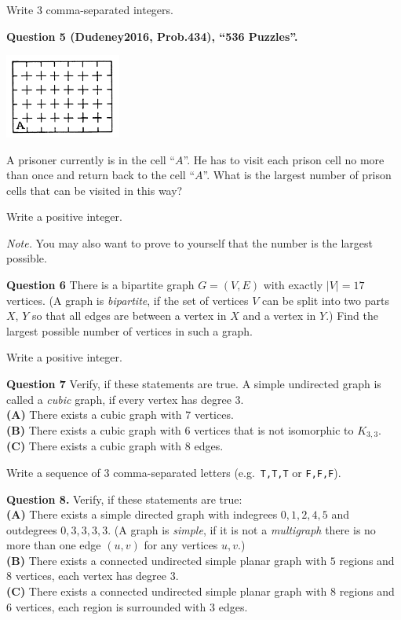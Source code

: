 \documentclass[jou]{apa6}
\begin{document}
Write $3$ comma-separated integers.



\vspace{10pt}
{\bf Question 5 (Dudeney2016, Prob.434), ``536 Puzzles''.}
\begin{center}
\includegraphics[width=1.5in]{prison-cells.png}
\end{center}
A prisoner currently is in the cell ``$A$''. He has to visit each 
prison cell no more than once and return 
back to the cell ``$A$''. What is the largest number of prison cells that
can be visited in this way?

Write a positive integer.

{\em Note.} You may also want to prove to yourself that the number is the largest possible.


\vspace{10pt}
{\bf Question 6}
There is a bipartite graph $G=(V,E)$ with exactly $|V| = 17$ vertices. (A graph is {\em bipartite}, if 
the set of vertices $V$ can be split into two parts $X$, $Y$ so that all edges are between a vertex in $X$ and a vertex in $Y$.)
Find the largest possible number of vertices in such a graph. 

Write a positive integer.
 

\vspace{10pt}
{\bf Question 7} Verify, if these statements are true. 
A simple undirected graph is called a {\em cubic} graph, 
if every vertex has degree $3$.\\
{\bf (A)} There exists a cubic graph with $7$ vertices.\\
{\bf (B)} There exists a cubic graph with $6$ vertices that is not isomorphic to $K_{3,3}$.\\
{\bf (C)} There exists a cubic graph with $8$ edges.

Write a sequence of 3 comma-separated letters (e.g.\ {\tt T,T,T} or {\tt F,F,F}).




\vspace{10pt}
{\bf Question 8.} Verify, if these statements are true:\\
{\bf (A)} There exists a simple directed graph with indegrees $0,1,2,4,5$ and outdegrees $0,3,3,3,3$. (A graph is {\em simple}, if
it is not a {\em multigraph} \textendash{} there is no more than one edge $(u,v)$ for any vertices $u,v$.)\\
{\bf (B)} There exists a connected undirected simple planar graph with $5$ regions and $8$ vertices, each vertex has degree $3$.\\
{\bf (C)} There exists a connected undirected simple planar graph with $8$ regions and $6$ vertices, each region is surrounded 
with $3$ edges.
\end{document}
